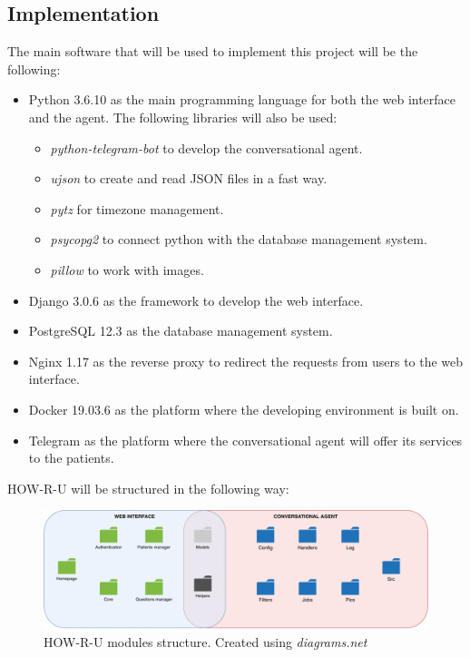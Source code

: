 \documentclass[12pt,english]{article}
\begin{document}
\subsection{Implementation}

The main software that will be used to implement this project will be the following:
\begin{itemize}
  \item Python 3.6.10 \cite{python} as the main programming language for both the web interface and the agent. The following libraries will also be used:
  \begin{itemize}
    \item \emph{python-telegram-bot} to develop the conversational agent.
    \item \emph{ujson} to create and read JSON files in a fast way.
    \item \emph{pytz} for timezone management.
    \item \emph{psycopg2} to connect python with the database management system.
    \item \emph{pillow} to work with images.
  \end{itemize}
  \item Django 3.0.6 \cite{django} as the framework to develop the web interface.
  \item PostgreSQL 12.3 \cite{postgres} as the database management system.
  \item Nginx 1.17 \cite{nginx} as the reverse proxy to redirect the requests from users to the web interface.
  \item Docker 19.03.6 \cite{docker} as the platform where the developing environment is built on.
  \item Telegram \cite{Telegram} as the platform where the conversational agent will offer its services to the patients.
\end{itemize}

HOW-R-U will be structured in the following way:

\begin{figure}[H]
  \centering
    \includegraphics[width=\textwidth]{repo_structure.pdf}
    \caption{HOW-R-U modules structure. Created using \emph{diagrams.net} \protect\cite{drawio}}
\end{figure}
\end{document}
